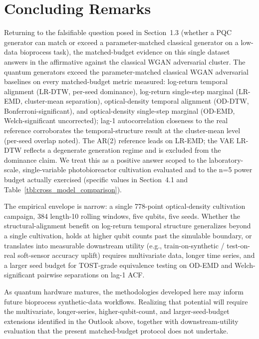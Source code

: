 \documentclass[12pt,twocolumn]{article}
\begin{document}
\section{Concluding Remarks}

Returning to the falsifiable question posed in Section~1.3 (whether a
PQC generator can match or exceed a parameter-matched classical generator
on a low-data bioprocess task), the matched-budget evidence on this
single dataset answers in the affirmative against the classical WGAN
adversarial cluster. The quantum generators exceed the parameter-matched
classical WGAN adversarial baselines on every matched-budget metric
measured: log-return temporal alignment (LR-DTW, per-seed dominance),
log-return single-step marginal (LR-EMD, cluster-mean separation), optical-density
temporal alignment (OD-DTW, Bonferroni-significant), and optical-density
single-step marginal (OD-EMD, Welch-significant uncorrected); lag-1 autocorrelation
closeness to the real reference corroborates the temporal-structure result
at the cluster-mean level (per-seed overlap noted). The AR(2) reference
leads on LR-EMD; the VAE LR-DTW reflects a degenerate generation regime
and is excluded from the dominance claim. We treat this as a positive
answer scoped to the laboratory-scale, single-variable photobioreactor
cultivation evaluated and to the n=5 power budget actually exercised
(specific values in Section~4.1 and Table~\ref{tbl:cross_model_comparison}).

The empirical envelope is narrow: a single 778-point optical-density
cultivation campaign, 384 length-10 rolling windows, five qubits, five
seeds. Whether the structural-alignment benefit on log-return temporal
structure generalizes beyond a single cultivation, holds at higher qubit
counts past the simulable boundary, or translates into measurable
downstream utility (e.g., train-on-synthetic / test-on-real soft-sensor
accuracy uplift) requires multivariate data, longer time series, and a
larger seed budget for TOST-grade equivalence testing on OD-EMD and
Welch-significant pairwise separations on lag-1 ACF.

As quantum hardware matures, the methodologies developed here may inform
future bioprocess synthetic-data workflows. Realizing that potential will
require the multivariate, longer-series, higher-qubit-count, and
larger-seed-budget extensions identified in the Outlook above, together
with downstream-utility evaluation that the present matched-budget
protocol does not undertake.






\newpage
\newpage
\clearpage
\appendix

\end{document}
